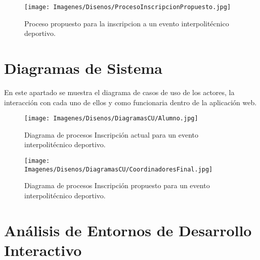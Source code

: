 		\begin{figure}[hbt!]
			\centering
			\texttt{[image: Imagenes/Disenos/ProcesoInscripcionPropuesto.jpg]}
			\caption{Proceso propuesto para la inscripcion a un evento interpolitécnico deportivo.}
			\label{ProcesoInscripcionPropuesto}
		\end{figure}
	
	
	\chapter{Diagramas de Sistema}
	\noindent En este apartado se muestra el diagrama de casos de uso de los actores, la interacción con cada uno de ellos y como funcionaria dentro de la aplicación web.
		\begin{figure}[hbt!]
			\centering
			\texttt{[image: Imagenes/Disenos/DiagramasCU/Alumno.jpg]}
			\caption{Diagrama de procesos Inscripción actual para un evento interpolitécnico deportivo.}
			\label{Inscripcion}
		\end{figure}
	\pagebreak
		\begin{figure}[hbt!]
			\centering
			\texttt{[image: Imagenes/Disenos/DiagramasCU/CoordinadoresFinal.jpg]}
			\caption{Diagrama de procesos Inscripción propuesto para un evento interpolitécnico deportivo.}
			\label{Inscripcion}
		\end{figure}
	
	\chapter{An\'alisis de Entornos de Desarrollo Interactivo}
	
		

